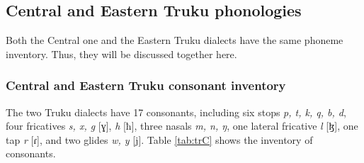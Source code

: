 \subsection{Central and Eastern Truku phonologies}
Both the Central one and the Eastern Truku dialects have the same phoneme inventory. Thus, they will be discussed together here. 

\subsubsection{Central and Eastern Truku consonant inventory}

The two Truku dialects have 17 consonants, including six stops \textit{p, t, k, q, b, d}, four fricatives \textit{s, x, g} [ɣ], \textit{h} [ħ], three nasals \textit{m, n, ŋ}, one lateral fricative \textit{l} [ɮ], one tap \textit{r} [ɾ], and two glides \textit{w, y} [j]. Table \ref{tab:trC} shows the inventory of consonants.

